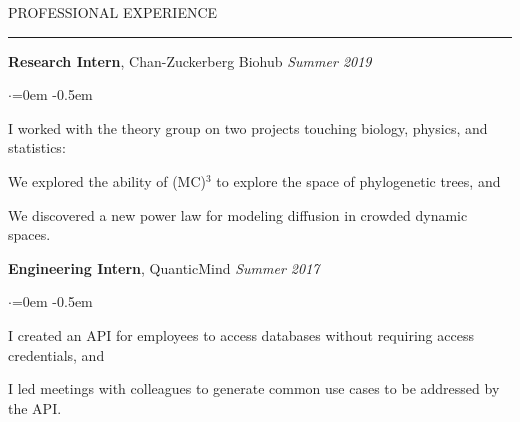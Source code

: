 \documentclass{resume} %
\renewenvironment{rSection}[1]{
\sectionskip
\textcolor{CarnegieMellonRed}{\MakeUppercase{#1}}
\sectionlineskip
\hrule
\begin{list}{}{
\setlength{\leftmargin}{1.5em}
}
\item[]
}{
\end{list}
}
\begin{document}
\begin{rSection}{Professional Experience}	
{\bf Research Intern}, Chan-Zuckerberg Biohub \hfill {\em Summer 2019}
\begin{list}{$\cdot$}{\leftmargin=0em} 
    \itemsep -0.5em \vspace{-0.5em}
      \item I worked with the theory group on two projects touching biology, physics, and statistics:
      \item We explored the ability of (MC)$^3$ to explore the space of phylogenetic trees, and
      \item We discovered a new power law for modeling diffusion in crowded dynamic spaces.
  \end{list}
  \vspace{1.em}

{\bf Engineering Intern}, QuanticMind \hfill {\em Summer 2017}
\begin{list}{$\cdot$}{\leftmargin=0em} 
    \itemsep -0.5em \vspace{-0.5em}
      \item I created an API for employees to access databases without requiring access credentials, and
      \item I led meetings with colleagues to generate common use cases to be addressed by the API.
  \end{list}
  \vspace{1.em}

\end{rSection}
\end{document}
